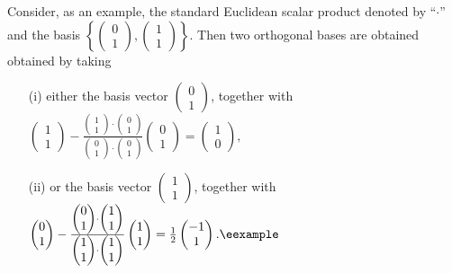 {\color{blue}
\bexample
Consider, as an example, the standard Euclidean scalar product denoted by ``$\cdot$''
and the basis
$\left\{\begin{pmatrix}0\\1\end{pmatrix},\begin{pmatrix}1\\1\end{pmatrix}\right\}$.
Then two orthogonal bases are obtained obtained by taking
\begin{itemize}
\item[(i)]
either the basis vector
$\begin{pmatrix}0\\1\end{pmatrix}$, together with
$
\begin{pmatrix}1\\1\end{pmatrix} -
\frac{\begin{pmatrix}1\\1\end{pmatrix}\cdot \begin{pmatrix}0\\1\end{pmatrix}}{\begin{pmatrix}0\\1\end{pmatrix}\cdot \begin{pmatrix}0\\1\end{pmatrix}} \begin{pmatrix}0\\1\end{pmatrix} = \begin{pmatrix}1\\0\end{pmatrix},
$
\item[(ii)]
or the basis vector
$\begin{pmatrix}1\\1\end{pmatrix}$, together with
$
\begin{pmatrix}0\\1\end{pmatrix} -
\frac{\begin{pmatrix}0\\1\end{pmatrix}\cdot \begin{pmatrix}1\\1\end{pmatrix}}{\begin{pmatrix}1\\1\end{pmatrix}\cdot \begin{pmatrix}1\\1\end{pmatrix}} \begin{pmatrix}1\\1\end{pmatrix} = \frac{1}{2}\begin{pmatrix}-1\\1\end{pmatrix}. \textrm{\eexample}
$
\end{itemize}
}
